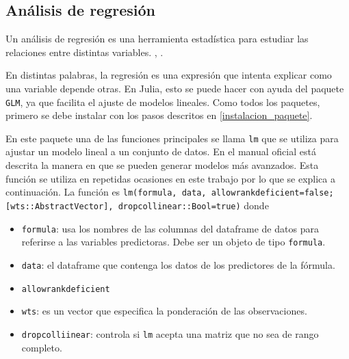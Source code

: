 \subsection{Análisis de regresión} \label{cap_regresiones}

Un análisis de regresión es una herramienta estadística para estudiar las relaciones entre distintas variables. , \cite{regression_other_stories}. 

En distintas palabras, la regresión es una expresión que intenta explicar como una variable depende otras. En \textsf{Julia}, esto se puede hacer con ayuda del paquete \texttt{GLM}, ya que facilita el ajuste de modelos lineales. Como todos los paquetes, primero se debe instalar con los pasos descritos en \ref{instalacion_paquete}. 

En este paquete una de las funciones principales se llama \texttt{lm} que se utiliza para ajustar un modelo lineal a un conjunto de datos. En el manual oficial \cite{glm_manual} está descrita la manera en que se pueden generar modelos más avanzados. Esta función se utiliza en repetidas ocasiones en este trabajo por lo que se explica a continuación. La función es \texttt{lm(formula, data, allowrankdeficient=false; [wts::AbstractVector], dropcollinear::Bool=true)} donde 


\begin{itemize}
    \item \texttt{formula}: usa los nombres de las columnas del dataframe de datos para referirse a las variables predictoras. Debe ser un objeto de tipo \texttt{formula}. 
    
    \item \texttt{data}: el dataframe que contenga los datos de los predictores de la fórmula.
    
    \item \texttt{allowrankdeficient}
    
    \item \texttt{wts}: es un vector que especifica la ponderación de las observaciones. 
    
    \item \texttt{dropcolliinear}: controla si \texttt{lm} acepta una matriz que no sea de rango completo. 
\end{itemize}



